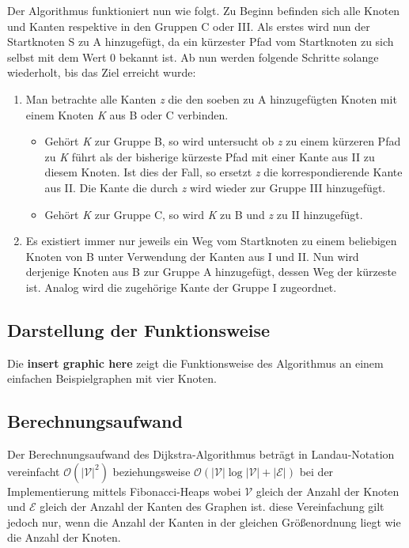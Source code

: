 		Der Algorithmus funktioniert nun wie folgt. Zu Beginn befinden sich alle Knoten und Kanten respektive in den Gruppen C oder III. Als erstes wird nun der Startknoten S zu A hinzugefügt, da ein kürzester Pfad vom Startknoten zu sich selbst mit dem Wert 0 bekannt ist. Ab nun werden folgende Schritte solange wiederholt, bis das Ziel erreicht wurde:
		\begin{center}
			\begin{minipage}{0.8\linewidth}

				\begin{enumerate}
					\item Man betrachte alle Kanten \textit{z} die den soeben zu A hinzugefügten Knoten mit einem Knoten \textit{K} aus B oder C verbinden. 
					\begin{itemize}
						\item Gehört \textit{K} zur Gruppe B, so wird untersucht ob \textit{z} zu einem kürzeren Pfad zu \textit{K} führt als der bisherige kürzeste Pfad mit einer Kante aus II zu diesem Knoten. Ist dies der Fall, so ersetzt \textit{z} die korrespondierende Kante aus II. Die Kante die durch \textit{z} wird wieder zur Gruppe III hinzugefügt.
						\item Gehört \textit{K} zur Gruppe  C, so wird \textit{K} zu B und \textit{z} zu II hinzugefügt.
					\end{itemize}
					\item Es existiert immer nur jeweils ein Weg vom Startknoten zu einem beliebigen Knoten von B unter Verwendung der Kanten aus I und II. Nun wird derjenige Knoten aus B zur Gruppe A hinzugefügt, dessen Weg der kürzeste ist. Analog wird die zugehörige Kante der Gruppe I zugeordnet.
				\end{enumerate}
			\end{minipage}
		\end{center}
	\subsection{Darstellung der Funktionsweise}
		Die \textbf{insert graphic here} zeigt die Funktionsweise des Algorithmus an einem einfachen Beispielgraphen mit vier Knoten.
	
	\subsection{Berechnungsaufwand}
		Der Berechnungsaufwand des Dijkstra-Algorithmus beträgt in Landau-Notation vereinfacht $\mathcal{O}(\lvert \mathcal{V}\rvert ^2)$ beziehungsweise $\mathcal{O}(\lvert \mathcal{V}\rvert  \log \lvert \mathcal{V}\rvert + \lvert \mathcal{E}\rvert) $ bei der Implementierung mittels Fibonacci-Heaps\cite{Fredman1984} wobei  $\mathcal{V} $ gleich der Anzahl der Knoten  und $\mathcal{E}$ gleich der Anzahl der Kanten des Graphen ist. diese Vereinfachung gilt jedoch nur, wenn die Anzahl der Kanten in der gleichen Größenordnung liegt wie die Anzahl der Knoten.
	
